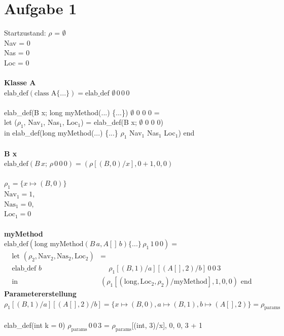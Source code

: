 \documentclass[11pt,a4paper]{article}
\begin{document}
\section{Aufgabe 1}
Startzustand:
$\rho$ = $\emptyset$\\
Nav = 0\\
Nas = 0\\
Loc = 0\\\\
%
\textbf{Klasse A}\\
$\text{elab\_def}(\text{class A\{...\}}) = \text{elab\_def } \emptyset \, 0 \, 0 \, 0$\\\\
elab\_def(B x; long myMethod(...) \{...\}) $\emptyset$ 0 0 0 =\\
let ($\rho_1$, Nav$_1$, Nas$_1$, Loc$_1$) = elab\_def(B x; $\emptyset$ 0 0 0) \\
in elab\_def(long myMethod(...) \{...\} $\rho_1$ Nav$_1$ Nas$_1$ Loc$_1$) end\\
%
\\
\textbf{B x}\\
$\text{elab\_def}(B \, x; \, \rho \, 0 \, 0 \, 0) = (\rho[(B, 0)/x], 0 + 1, 0, 0)$\\\\
%
$\rho_1 = \{x \mapsto (B, 0)\}$\\
$\text{Nav}_1 = 1$, \\$\text{Nas}_1 = 0$, \\$\text{Loc}_1 = 0$\\\\
%
\textbf{myMethod}\\
$\text{elab\_def}(\text{long myMethod}(B \, a, A[] \, b) \{...\} \, \rho_1 \, 1 \, 0 \, 0) =$
\begin{align*}
\text{let } (\rho_2, \text{Nav}_2, \text{Nas}_2, \text{Loc}_2) &=\\
\text{elab\_def } b
&\quad\, \rho_1[(B, 1)/a][(A[], 2)/b] \, 0 \, 0 \, 3 \\
\text{in } &(\rho_1[(\text{long}, \text{Loc}_2, \rho_2)/\text{myMethod}], 1, 0, 0) \text{ end}
\end{align*}
%
\textbf{Parametererstellung}\\
$\rho_1[(B, 1)/a][(A[], 2)/b] = \{x \mapsto (B, 0), a \mapsto (B, 1), b \mapsto (A[], 2)\} = \rho_{\text{params}}$\\\\
%
elab\_def(int k = 0) $\rho_{\text{params}} \, 0 \, 0 \, 3$ =
    $\rho_{\text{params}}$[(int, 3)/x], 0, 0, 3 + 1\\\\
\end{document}
